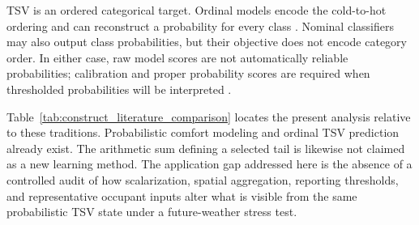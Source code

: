 TSV is an ordered categorical target. Ordinal models encode the cold-to-hot ordering and can reconstruct a probability for every class \citep{McCullagh1980Ordinal,Agresti2010Ordinal,Favero2023Ordinal}. Nominal classifiers may also output class probabilities, but their objective does not encode category order. In either case, raw model scores are not automatically reliable probabilities; calibration and proper probability scores are required when thresholded probabilities will be interpreted \citep{Niculescu-Mizil2005PredictingGP,Gneiting2007Scoring}.

Table~\ref{tab:construct_literature_comparison} locates the present analysis relative to these traditions. Probabilistic comfort modeling and ordinal TSV prediction already exist. The arithmetic sum defining a selected tail is likewise not claimed as a new learning method. The application gap addressed here is the absence of a controlled audit of how scalarization, spatial aggregation, reporting thresholds, and representative occupant inputs alter what is visible from the same probabilistic TSV state under a future-weather stress test.

